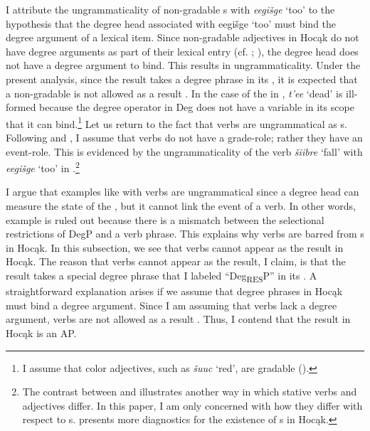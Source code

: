 \documentclass[output=paper]{LSP/langsci}
\begin{document}
 
I attribute the ungrammaticality of non-gradable s with \textit{eegišge} `too' to the hypothesis that the degree head associated with eegišge `too' must bind the degree argument of a lexical item. Since non-gradable adjectives in Hocąk do not have degree arguments as part of their lexical entry (cf. \citealt{Higginbotham1985}; \citealt{Corver1997}), the degree head does not have a degree argument to bind. This results in ungrammaticality. Under the present analysis, since the result takes a degree phrase in its , it is expected that a non-gradable  is not allowed as a result . In the case of the  in , \textit{t'ee} `dead' is ill-formed because the degree operator in Deg does not have a variable in its scope that it can bind.\footnote{I assume that color adjectives, such as \textit{šuuc} `red', are gradable (\citealt{KennedyMcNally2010}).} Let us return to the fact that verbs are ungrammatical as  s. Following \citet{Higginbotham1985} and \citet{Corver1997}, I assume that verbs do not have a grade-role; rather they have an event-role. This is evidenced by the ungrammaticality of the verb \textit{šiibre} `fall' with \textit{eegišge} `too' in .\footnote{The contrast between  and  illustrates another way in which stative verbs and adjectives differ. In this paper, I am only concerned with how they differ with respect to s. \citet{Rosen2014,Rosen2015} presents more diagnostics for the existence of s in Hocąk.}
 

\begin{exe}


\end{exe}
  
I argue that  examples like  with verbs are ungrammatical since a degree head can measure the state of the , but it cannot link the event of a verb. In other words, example  is ruled out because there is a mismatch between the selectional restrictions of DegP and a verb phrase. This explains why verbs are barred from s in Hocąk. In this subsection, we see that verbs cannot appear as the result  in Hocąk. The reason that verbs cannot appear as the result, I claim, is that the result  takes a special degree phrase that I labeled ``Deg\textsubscript{RES}P'' in its . A straightforward explanation arises if we assume that degree phrases in Hocąk must bind a degree argument. Since I am assuming that verbs lack a degree argument, verbs are not allowed as a result . Thus, I contend that the result  in Hocąk is an AP.
 
\end{document}
